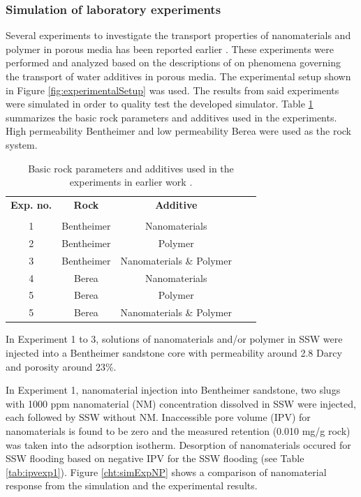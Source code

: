 \documentclass[energies,article,submit,moreauthors,pdftex]{Definitions/mdpi}
\begin{document}
\subsubsection{Simulation of laboratory experiments}
Several experiments to investigate the transport properties of nanomaterials and polymer in porous media has been reported earlier \cite{Najafiazar2016, Najafiazar2016a}. These experiments were performed and analyzed based on the descriptions of \citet{Lotsch1985} on phenomena governing the transport of water additives in porous media. The experimental setup shown in Figure \ref{fig:experimentalSetup} was used. The results from said experiments were simulated in order to quality test the developed simulator. Table \ref{tab:rockParams} summarizes the basic rock parameters and additives used in the experiments. High permeability Bentheimer and low permeability Berea were used as the rock system. 

\begin{table}[h!]
\small
\centering
\caption{Basic rock parameters and additives used in the experiments in earlier work \cite{Najafiazar2016}.}
\label{tab:rockParams}
\begin{tabular}{c c c c l } 
\toprule
\textbf{Exp. no.} & \textbf{Rock}  & \textbf{Additive} \\ 
& & \\
\midrule 
1   & Bentheimer & Nanomaterials\\
2   & Bentheimer & Polymer \\ 
3   & Bentheimer & Nanomaterials \& Polymer \\ 
4   & Berea        & Nanomaterials\\
5   & Berea        & Polymer \\ 
5   & Berea        & Nanomaterials \& Polymer \\ 
\bottomrule
\end{tabular}
\end{table}

In Experiment 1 to 3, solutions of nanomaterials and/or polymer in SSW were injected into a Bentheimer sandstone core with permeability around 2.8 Darcy and porosity around 23\%.

In Experiment 1, nanomaterial injection into Bentheimer sandstone, two slugs with 1000 ppm nanomaterial (NM) concentration dissolved in SSW were injected, each followed by SSW without NM. Inaccessible pore volume (IPV) for nanomaterials is found to be zero and the measured retention (0.010 mg/g rock) was taken into the adsorption isotherm. Desorption of nanomaterials occured for SSW flooding based on negative IPV for the SSW flooding (see Table \ref{tab:ipvexp1}). Figure \ref{cht:simExpNP} shows a comparison of nanomaterial response from the simulation and the experimental results.
\end{document}
